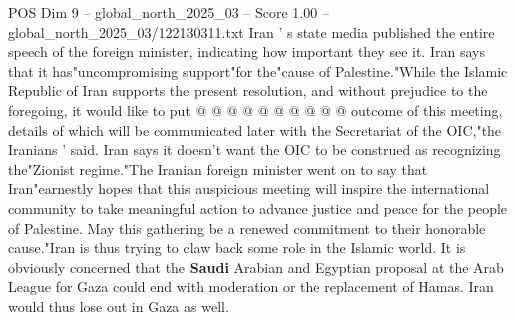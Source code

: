 \begin{textsample}{POS Dim 9 – global\_north\_2025\_03 – Score 1.00 – global\_north\_2025\_03/122130311.txt}
Iran ' s state media published the entire speech of the foreign minister, indicating how important they see it.
Iran says that it has"uncompromising support"for the"cause of Palestine."While the Islamic Republic of Iran supports the present resolution, and without prejudice to the foregoing, it would like to put @ @ @ @ @ @ @ @ @ @ outcome of this meeting, details of which will be communicated later with the Secretariat of the OIC,"the Iranians ' said.
Iran says it doesn't want the OIC to be construed as recognizing the"Zionist regime."The Iranian foreign minister went on to say that Iran"earnestly hopes that this auspicious meeting will inspire the international community to take meaningful action to advance justice and peace for the people of Palestine.
May this gathering be a renewed commitment to their honorable cause."Iran is thus trying to claw back some role in the Islamic world.
It is obviously concerned that the \textbf{Saudi} Arabian and Egyptian proposal at the Arab League for Gaza could end with moderation or the replacement of Hamas.
Iran would thus lose out in Gaza as well.

\end{textsample}
